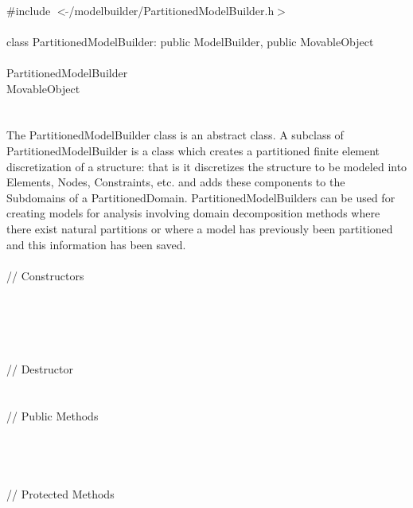 
   \\
\indent \#include $<\tilde{ }$/modelbuilder/PartitionedModelBuilder.h$>$  \\

  \\
\indent class PartitionedModelBuilder: public ModelBuilder, public MovableObject  \\

 \\
\indent  PartitionedModelBuilder \\
\indent  MovableObject \\
\indent{} \\

 \\ 
\indent The PartitionedModelBuilder class is an abstract class. A subclass
of PartitionedModelBuilder is a class which creates a partitioned finite element
discretization of a structure: that is it discretizes the structure to
be modeled into Elements, Nodes, Constraints, etc. and adds these
components to the Subdomains of a PartitionedDomain.
PartitionedModelBuilders can be used for creating models for analysis
involving domain decomposition methods where there exist natural
partitions or where a model has previously been partitioned and this
information has been saved. \\

 \\
\indent\indent // Constructors \\ 
\indent{}\\ 
\indent{} \\ \\
\indent{}\\ \\
\indent\indent // Destructor \\ 
\indent{}\\  \\
\indent\indent // Public Methods \\ 
\indent{} \\
\indent{} \\ 
\indent{} \\ \\
\indent\indent // Protected Methods \\ 
\indent{} \\

